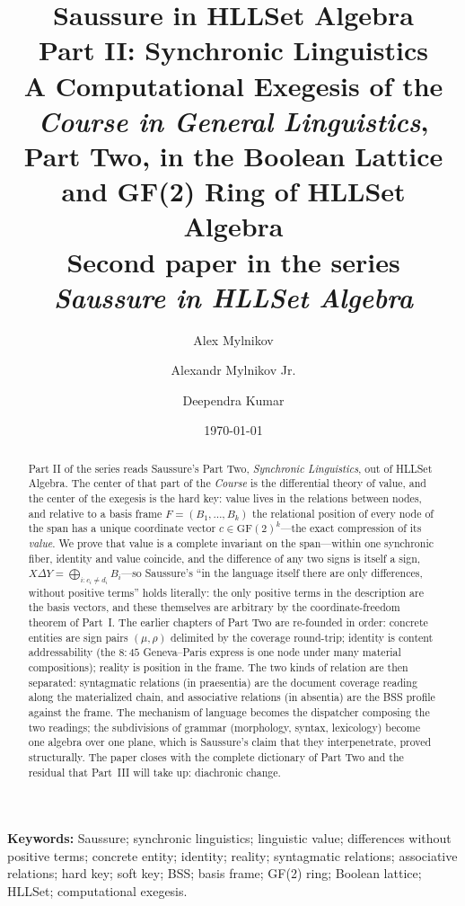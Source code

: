 \documentclass[11pt,a4paper]{article}
\title{\textbf{Saussure in HLLSet Algebra}\\[4pt]
\large Part II: Synchronic Linguistics\\[4pt]
\large A Computational Exegesis of the \textit{Course in General Linguistics},\\
Part Two, in the Boolean Lattice and GF(2) Ring of HLLSet Algebra\\[6pt]
\normalsize Second paper in the series \textit{Saussure in HLLSet Algebra}}
\author{Alex Mylnikov \and Alexandr Mylnikov Jr. \and Deependra Kumar}
\date{\today}
\theoremstyle{remark}
\newcommand{\xor}{\ensuremath{\Delta}}                   %
\newcommand{\Ing}{\ensuremath{\mu}}                      %
\newcommand{\Mat}{\ensuremath{\rho}}                     %
\begin{document}
\maketitle

\begin{abstract}
Part II of the series reads Saussure's Part Two, \emph{Synchronic
Linguistics}, out of HLLSet Algebra. The center of that part of the
\textit{Course} is the differential theory of value, and the center of the
exegesis is the hard key: value lives in the relations between nodes, and
relative to a basis frame
$F=(B_1,\dots,B_k)$ the relational position of every node of the span has a
unique coordinate vector
$c\in\mathrm{GF}(2)^k$---the exact compression of its \emph{value}. We prove
that
value is a complete invariant on the span---within one synchronic fiber,
identity and value coincide, and the difference of any two signs is itself a
sign,
$X \xor Y = \bigoplus_{i:c_i \neq d_i} B_i$---so Saussure's ``in the language
itself there are only differences, without positive terms'' holds literally:
the only positive terms in the description are the basis vectors, and these
themselves are arbitrary by the coordinate-freedom theorem of Part~I.
The earlier chapters of Part Two are re-founded in order: concrete entities
are sign pairs $(\Ing,\Mat)$ delimited by the coverage round-trip; identity is
content addressability (the $8{:}45$ Geneva--Paris express is one node under
many material compositions); reality is position in the frame. The two kinds
of relation are then separated: syntagmatic relations (in praesentia) are the
document coverage reading along the materialized chain, and associative
relations (in absentia) are the BSS profile against the frame. The mechanism
of language
becomes the dispatcher composing the two readings; the subdivisions of grammar
(morphology, syntax, lexicology) become one algebra over one plane, which is
Saussure's claim that they interpenetrate, proved structurally. The paper
closes with the complete dictionary of Part Two and the residual that Part~III
will take up: diachronic change.
\end{abstract}

\noindent\textbf{Keywords:} Saussure; synchronic linguistics; linguistic
value; differences without positive terms; concrete entity; identity;
reality; syntagmatic relations; associative relations; hard key; soft key;
BSS; basis frame; GF(2) ring; Boolean lattice; HLLSet; computational
exegesis.

\end{document}
